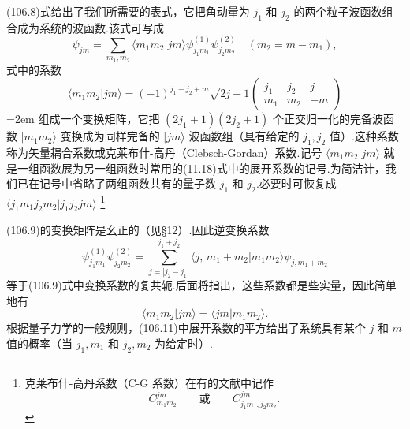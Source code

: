 (106.8)式给出了我们所需要的表式，它把角动量为 $j_1$ 和 $j_2$ 的两个粒子波函数组合成为系统的波函数.该式可写成
\begin{equation}
  \psi_{jm}=\sum_{m_1,m_2}\langle m_1m_2|jm\rangle
  \psi^{(1)}_{j_1m_1}\psi^{(2)}_{j_2m_2}
  \quad(m_2=m-m_1),
\end{equation}
式中的系数
\begin{equation}
  \langle m_1m_2|jm\rangle=(-1)^{j_1-j_2+m}\sqrt{2j+1}
  \left(\begin{array}{ccc}j_1&j_2&j\\m_1&m_2&-m\end{array}\right)
\end{equation}
\emergencystretch=2em%
组成一个变换矩阵，它把 $(2j_1+1)(2j_2+1)$ 个正交归一化的完备波函数 $|m_1m_2\rangle$ 变换成为同样完备的 $|jm\rangle$ 波函数组（具有给定的 $j_1,j_2$ 值）.这种系数称为矢量耦合系数或克莱布什-高丹（Clebsch-Gordan）系数.记号 $\langle m_1m_2|jm\rangle$ 就是一组函数展为另一组函数时常用的(11.18)式中的展开系数的记号.为简洁计，我们已在记号中省略了两组函数共有的量子数 $j_1$ 和 $j_2$.必要时可恢复成 $\langle j_1m_1j_2m_2|j_1j_2jm\rangle$ \footnote{克莱布什-高丹系数（C-G 系数）在有的文献中记作
\begin{equation*}
  C_{m_1m_2}^{jm}\qquad\text{或}\qquad C_{j_1m_1,j_2m_2}^{jm}.
\end{equation*}}\par
\emergencystretch=0pt%

(106.9)的变换矩阵是幺正的（见§12）.因此逆变换系数
\begin{equation}
  \psi^{(1)}_{j_1m_1}\psi^{(2)}_{j_2m_2}
  =\sum_{j=|j_2-j_1|}^{j_1+j_2}\langle j,\,m_1+m_2|m_1m_2\rangle
  \psi_{j,m_1+m_2}
\end{equation}
等于(106.9)式中变换系数的复共轭.后面将指出，这些系数都是些实量，因此简单地有
\begin{equation*}
  \langle m_1m_2|jm\rangle=\langle jm|m_1m_2\rangle.
\end{equation*}
根据量子力学的一般规则，(106.11)中展开系数的平方给出了系统具有某个 $j$ 和 $m$ 值的概率（当 $j_1,m_1$ 和 $j_2,m_2$ 为给定时）.

